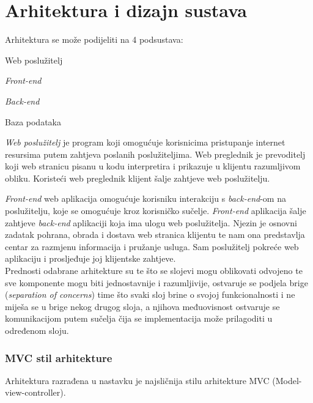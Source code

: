 \chapter{Arhitektura i dizajn sustava}
		
		Arhitektura se može podijeliti na 4 podsustava:
		\begin{packed_item}
		
			\item   Web poslužitelj
			\item   \textit{Front-end}
			\item 	\textit{Back-end}
			\item   Baza podataka
		\end{packed_item}
		
		
		\textit{Web poslužitelj} je program koji omogućuje korisnicima pristupanje internet resursima putem zahtjeva poslanih poslužiteljima. Web preglednik je prevoditelj koji web stranicu pisanu u kodu interpretira i prikazuje u klijentu razumljivom obliku. Koristeći web preglednik klijent šalje zahtjeve web poslužitelju.
		
		\textit{Front-end} web aplikacija omogućuje korisniku interakciju s \textit{back-end}-om na poslužitelju, koje se omogućuje kroz korisničko sučelje. 
		\textit{Front-end} aplikacija šalje zahtjeve \textit{back-end} aplikaciji koja ima ulogu web poslužitelja. Njezin je osnovni zadatak pohrana, obrada i dostava web stranica klijentu te nam ona predstavlja centar za razmjenu informacija i pružanje usluga. Sam poslužitelj pokreće web aplikaciju i prosljeđuje joj klijentske zahtjeve.\\

		Prednosti odabrane arhitekture su te što se slojevi mogu oblikovati odvojeno te sve komponente mogu biti jednostavnije i razumljivije, ostvaruje se podjela brige (\textit{separation of concerns}) time što svaki sloj brine o svojoj funkcionalnosti i ne miješa se u brige nekog drugog sloja, a njihova međuovisnost ostvaruje se komunikacijom putem sučelja čija se implementacija može prilagoditi u određenom sloju.\\

		\pagebreak

		\subsection{MVC stil arhitekture}
		Arhitektura razrađena u nastavku je najsličnija stilu arhitekture MVC (Model-view-controller).\\
		
